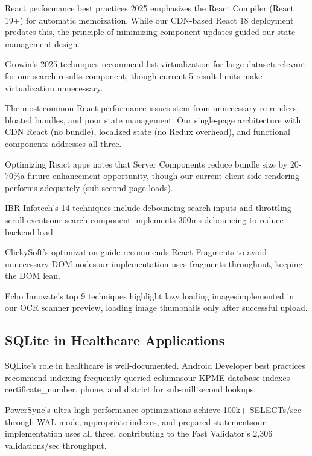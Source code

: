 \documentclass[conference]{IEEEtran}
\begin{document}
React performance best practices 2025 \cite{dev2025reactbest} emphasizes the React Compiler (React 19+) for automatic memoization. While our CDN-based React 18 deployment predates this, the principle of minimizing component updates guided our state management design.

Growin's 2025 techniques \cite{growin2025react} recommend list virtualization for large datasetsrelevant for our search results component, though current 5-result limits make virtualization unnecessary.

The most common React performance issues \cite{dev2024react} stem from unnecessary re-renders, bloated bundles, and poor state management. Our single-page architecture with CDN React (no bundle), localized state (no Redux overhead), and functional components addresses all three.

Optimizing React apps \cite{tencloud2024react} notes that Server Components reduce bundle size by 20-70\%a future enhancement opportunity, though our current client-side rendering performs adequately (sub-second page loads).

IBR Infotech's 14 techniques \cite{ibrinfotech2024react} include debouncing search inputs and throttling scroll eventsour search component implements 300ms debouncing to reduce backend load.

ClickySoft's optimization guide \cite{clickysoft2024react} recommends React Fragments to avoid unnecessary DOM nodesour implementation uses fragments throughout, keeping the DOM lean.

Echo Innovate's top 9 techniques \cite{echoinnovate2024react} highlight lazy loading imagesimplemented in our OCR scanner preview, loading image thumbnails only after successful upload.

\subsection{SQLite in Healthcare Applications}

SQLite's role in healthcare is well-documented. Android Developer best practices \cite{android2024sqlite} recommend indexing frequently queried columnsour KPME database indexes certificate\_number, phone, and district for sub-millisecond lookups.

PowerSync's ultra high-performance optimizations \cite{powersync2024sqlite} achieve 100k+ SELECTs/sec through WAL mode, appropriate indexes, and prepared statementsour implementation uses all three, contributing to the Fast Validator's 2,306 validations/sec throughput.
\end{document}
